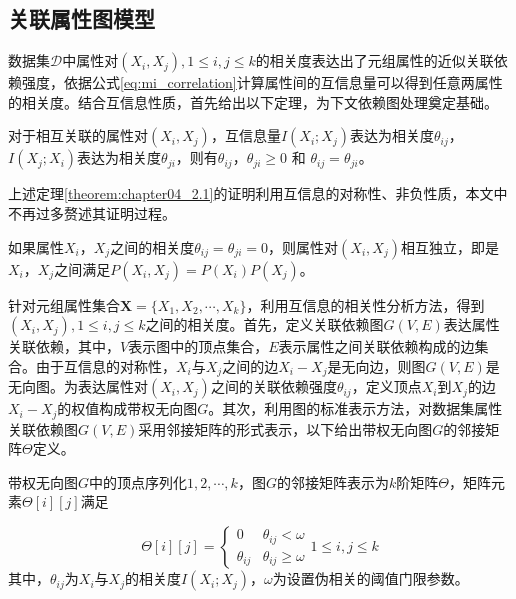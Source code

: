 \subsection{关联属性图模型}
数据集$\mathcal{D}$中属性对$(X_i,X_j),1\leq i,j \leq k$的相关度表达出了元组属性的近似关联依赖强度，依据公式\ref{eq:mi_correlation}计算属性间的互信息量可以得到任意两属性的相关度。结合互信息性质，首先给出以下定理，为下文依赖图处理奠定基础。


\begin{theorem}\label{theorem:chapter04_2.1}
	对于相互关联的属性对$(X_i,X_j)$，互信息量$I(X_i;X_j)$表达为相关度$\theta_{ij}$，$I(X_j;X_i)$表达为相关度$\theta_{ji}$，则有$\theta_{ij}$，$\theta_{ji} \geq 0$ 和 $\theta_{ij}=\theta_{ji}$。
\end{theorem}

上述定理\ref{theorem:chapter04_2.1}的证明利用互信息的对称性、非负性质，本文中不再过多赘述其证明过程。

\begin{corollary}\label{cor:chapter04_2.2}如果属性$X_i$，$X_j$之间的相关度$\theta_{ij}=\theta_{ji}=0$，则属性对$(X_i,X_j)$相互独立，即是$X_i$，$X_j$之间满足$P(X_i,X_j)=P(X_i)P(X_j)$。
\end{corollary}

针对元组属性集合$\bm{X}=\{X_1,X_2,\cdots,X_k\}$，利用互信息的相关性分析方法，得到$(X_i,X_j),1\leq i,j \leq k$之间的相关度。首先，定义关联依赖图$G(V,E)$表达属性关联依赖，其中，$V$表示图中的顶点集合，$E$表示属性之间关联依赖构成的边集合。由于互信息的对称性，$X_i$与$X_j$之间的边$X_i-X_j$是无向边，则图$G(V,E)$是无向图。为表达属性对$(X_i,X_j)$之间的关联依赖强度$\theta_{ij}$，定义顶点$X_i$到$X_j$的边$X_i-X_j$的权值构成带权无向图$G$。其次，利用图的标准表示方法，对数据集属性关联依赖图$G(V,E)$采用邻接矩阵的形式表示，以下给出带权无向图$G$的邻接矩阵$\Theta$定义。


\begin{definition}带权无向图$G$中的顶点序列化$1,2,\cdots,k$，图$G$的邻接矩阵表示为$k$阶矩阵$\Theta$，矩阵元素$\Theta[i][j]$满足
	
	\begin{equation}
		\Theta[i][j]=
		\begin{cases}
			0 & \text{$\theta_{ij} < \omega $}\\ %
			\theta_{ij} & \text{$\theta_{ij} \geq \omega $}
		\end{cases}
		\text{$1 \leq i,j \leq k$}
	\end{equation}
其中，$\theta_{ij}$为$X_i$与$X_j$的相关度$I(X_i;X_j)$，$\omega$为设置伪相关的阈值门限参数。
\end{definition}


